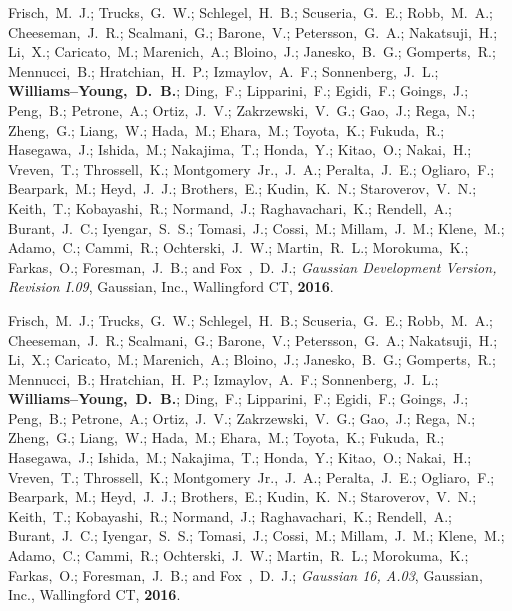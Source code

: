 \documentclass[10pt]{res} %
\newcommand*\me[0]{{\bf Williams--Young,~D.~B.}}
\newcommand*\xsli[0]{Li,~X.}
\begin{document}
\begin{resume}
\begin{etaremune}
\item Frisch,~M.~J.; Trucks,~G.~W.; Schlegel,~H.~B.; Scuseria,~G.~E.; Robb,~M.~A.;
      Cheeseman,~J.~R.; Scalmani,~G.; Barone,~V.; Petersson,~G.~A.; Nakatsuji,~H.; \xsli;
      Caricato,~M.; Marenich,~A.; Bloino,~J.; Janesko,~B.~G.; Gomperts,~R.; Mennucci,~B.;
      Hratchian,~H.~P.; Izmaylov,~A.~F.; Sonnenberg,~J.~L.; \me; Ding,~F.; Lipparini,~F.;
      Egidi,~F.; Goings,~J.; Peng,~B.; Petrone,~A.; Ortiz,~J.~V.; Zakrzewski,~V.~G.; Gao,~J.;
      Rega,~N.; Zheng,~G.; Liang,~W.; Hada,~M.; Ehara,~M.; Toyota,~K.; Fukuda,~R.; Hasegawa,~J.;
      Ishida,~M.; Nakajima,~T.; Honda,~Y.; Kitao,~O.; Nakai,~H.; Vreven,~T.; Throssell,~K.; Montgomery~Jr.,~J.~A.;
      Peralta,~J.~E.; Ogliaro,~F.; Bearpark,~M.; Heyd,~J.~J.; Brothers,~E.; Kudin,~K.~N.; Staroverov,~V.~N.; Keith,~T.;
      Kobayashi,~R.; Normand,~J.; Raghavachari,~K.; Rendell,~A.; Burant,~J.~C.; Iyengar,~S.~S.;
      Tomasi,~J.; Cossi,~M.; Millam,~J.~M.; Klene,~M.; Adamo,~C.; Cammi,~R.;
      Ochterski,~J.~W.; Martin,~R.~L.; Morokuma,~K.; Farkas,~O.; Foresman,~J.~B.; and Fox~,~D.~J.;
      \emph{Gaussian Development Version, Revision I.09},
      Gaussian, Inc., Wallingford CT, \textbf{2016}.

\item Frisch,~M.~J.; Trucks,~G.~W.; Schlegel,~H.~B.; Scuseria,~G.~E.; Robb,~M.~A.;
      Cheeseman,~J.~R.; Scalmani,~G.; Barone,~V.; Petersson,~G.~A.; Nakatsuji,~H.; \xsli;
      Caricato,~M.; Marenich,~A.; Bloino,~J.; Janesko,~B.~G.; Gomperts,~R.; Mennucci,~B.;
      Hratchian,~H.~P.; Izmaylov,~A.~F.; Sonnenberg,~J.~L.; \me; Ding,~F.; Lipparini,~F.;
      Egidi,~F.; Goings,~J.; Peng,~B.; Petrone,~A.; Ortiz,~J.~V.; Zakrzewski,~V.~G.; Gao,~J.;
      Rega,~N.; Zheng,~G.; Liang,~W.; Hada,~M.; Ehara,~M.; Toyota,~K.; Fukuda,~R.; Hasegawa,~J.;
      Ishida,~M.; Nakajima,~T.; Honda,~Y.; Kitao,~O.; Nakai,~H.; Vreven,~T.; Throssell,~K.; Montgomery~Jr.,~J.~A.;
      Peralta,~J.~E.; Ogliaro,~F.; Bearpark,~M.; Heyd,~J.~J.; Brothers,~E.; Kudin,~K.~N.; Staroverov,~V.~N.; Keith,~T.;
      Kobayashi,~R.; Normand,~J.; Raghavachari,~K.; Rendell,~A.; Burant,~J.~C.; Iyengar,~S.~S.;
      Tomasi,~J.; Cossi,~M.; Millam,~J.~M.; Klene,~M.; Adamo,~C.; Cammi,~R.;
      Ochterski,~J.~W.; Martin,~R.~L.; Morokuma,~K.; Farkas,~O.; Foresman,~J.~B.; and Fox~,~D.~J.;
      \emph{Gaussian 16, A.03},
      Gaussian, Inc., Wallingford CT, \textbf{2016}.
\end{etaremune}

\vspace{0.2in} %


\end{resume}
\end{document}
